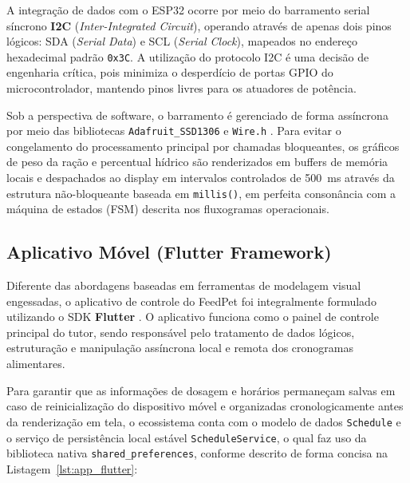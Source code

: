 \documentclass[12pt]{article}\usepackage{sbc-template}\usepackage{graphicx,url}\usepackage[utf8]{inputenc}
\begin{document}
A integração de dados com o ESP32 ocorre por meio do barramento serial síncrono \textbf{I2C} (\textit{Inter-Integrated Circuit}), operando através de apenas dois pinos lógicos: SDA (\textit{Serial Data}) e SCL (\textit{Serial Clock}), mapeados no endereço hexadecimal padrão \lstinline$0x3C$. A utilização do protocolo I2C é uma decisão de engenharia crítica, pois minimiza o desperdício de portas GPIO do microcontrolador, mantendo pinos livres para os atuadores de potência.

Sob a perspectiva de software, o barramento é gerenciado de forma assíncrona por meio das bibliotecas \lstinline$Adafruit_SSD1306$ e \lstinline$Wire.h$ \cite{adafruit:ssd1306}. Para evitar o congelamento do processamento principal por chamadas bloqueantes, os gráficos de peso da ração e percentual hídrico são renderizados em buffers de memória locais e despachados ao display em intervalos controlados de 500~ms através da estrutura não-bloqueante baseada em \lstinline$millis()$, em perfeita consonância com a máquina de estados (FSM) descrita nos fluxogramas operacionais.

\subsection{Aplicativo Móvel (Flutter Framework)}
Diferente das abordagens baseadas em ferramentas de modelagem visual engessadas, o aplicativo de controle do FeedPet foi integralmente formulado utilizando o SDK \textbf{Flutter} \cite{flutter:26}. O aplicativo funciona como o painel de controle principal do tutor, sendo responsável pelo tratamento de dados lógicos, estruturação e manipulação assíncrona local e remota dos cronogramas alimentares.

Para garantir que as informações de dosagem e horários permaneçam salvas em caso de reinicialização do dispositivo móvel e organizadas cronologicamente antes da renderização em tela, o ecossistema conta com o modelo de dados \lstinline$Schedule$ e o serviço de persistência local estável \lstinline$ScheduleService$, o qual faz uso da biblioteca nativa \lstinline$shared_preferences$, conforme descrito de forma concisa na Listagem~\ref{lst:app_flutter}:
\end{document}
